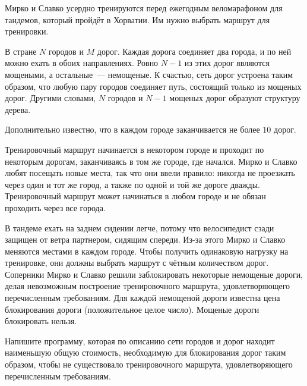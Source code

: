 Мирко и Славко усердно тренируются перед ежегодным веломарафоном для тандемов, который пройдёт
в Хорватии. Им нужно выбрать маршрут для тренировки.

В стране $N$ городов и $M$ дорог. Каждая дорога соединяет два города, и по ней можно ехать в обоих
направлениях. Ровно $N - 1$ из этих дорог являются мощеными, а остальные~--- немощеные. К счастью,
сеть дорог устроена таким образом, что любую пару городов соединяет путь, состоящий только из
мощеных дорог. Другими словами, $N$ городов и $N - 1$ мощеных дорог образуют структуру дерева.

Дополнительно известно, что в каждом городе заканчивается не более $10$ дорог.

Тренировочный маршрут начинается в некотором городе и проходит по некоторым дорогам,
заканчиваясь в том же городе, где начался. Мирко и Славко любят посещать новые места, так что они
ввели правило: никогда не проезжать через один и тот же город, а также по одной и той же дороге
дважды. Тренировочный маршрут может начинаться в любом городе и не обязан проходить через все
города.

В тандеме ехать на заднем сидении легче, потому что велосипедист сзади защищен от ветра партнером,
сидящим спереди. Из-за этого Мирко и Славко меняются местами в каждом городе. Чтобы получить
одинаковую нагрузку на тренировке, они должны выбрать маршрут с чётным количеством дорог.
Соперники Мирко и Славко решили заблокировать некоторые немощеные дороги, делая
невозможным построение тренировочного маршрута, удовлетворяющего перечисленным требованиям.
Для каждой немощеной дороги известна цена блокирования дороги (положительное целое число).
Мощеные дороги блокировать нельзя. 

Напишите программу, которая по описанию сети городов и дорог находит наименьшую общую
стоимость, необходимую для блокирования дорог таким образом, чтобы не существовало
тренировочного маршрута, удовлетворяющего перечисленным требованиям. 